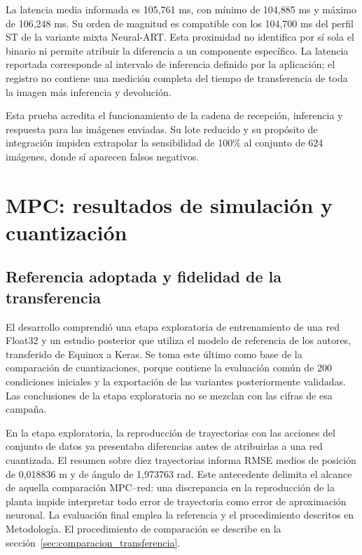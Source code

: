 La latencia media informada es 105,761 ms, con mínimo de 104,885 ms y máximo de 106,248 ms. Su orden de magnitud es compatible con los 104,700 ms del perfil ST de la variante mixta Neural-ART. Esta proximidad no identifica por sí sola el binario ni permite atribuir la diferencia a un componente específico. La latencia reportada corresponde al intervalo de inferencia definido por la aplicación; el registro no contiene una medición completa del tiempo de transferencia de toda la imagen más inferencia y devolución.

Esta prueba acredita el funcionamiento de la cadena de recepción, inferencia y respuesta para las imágenes enviadas. Su lote reducido y su propósito de integración impiden extrapolar la sensibilidad de 100\% al conjunto de 624 imágenes, donde sí aparecen falsos negativos.

\FloatBarrier
\section{MPC: resultados de simulación y cuantización}
\FloatBarrier
\subsection{Referencia adoptada y fidelidad de la transferencia}\label{sec:equivalencia_mpc}
El desarrollo comprendió una etapa exploratoria de entrenamiento de una red Float32 y un estudio posterior que utiliza el modelo de referencia de los autores, transferido de Equinox a Keras. Se toma este último como base de la comparación de cuantizaciones, porque contiene la evaluación común de 200 condiciones iniciales y la exportación de las variantes posteriormente validadas. Las conclusiones de la etapa exploratoria no se mezclan con las cifras de esa campaña.

En la etapa exploratoria, la reproducción de trayectorias con las acciones del conjunto de datos ya presentaba diferencias antes de atribuirlas a una red cuantizada. El resumen sobre diez trayectorias informa RMSE medios de posición de 0,018836 m y de ángulo de 1,973763 rad. Este antecedente delimita el alcance de aquella comparación MPC--red: una discrepancia en la reproducción de la planta impide interpretar todo error de trayectoria como error de aproximación neuronal. La evaluación final emplea la referencia y el procedimiento descritos en Metodología.
El procedimiento de comparación se describe en la sección~\ref{sec:comparacion_transferencia}.

